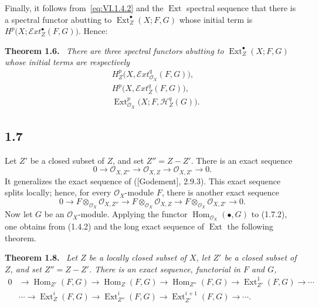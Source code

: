 \documentclass[11pt,a4paper]{article}
\newcommand{\OX}{\mathcal O_X}
\newcommand{\OXZ}[1]{\mathcal O_{X,#1}}
\newcommand{\Ext}{\operatorname{Ext}}
\newcommand{\Homop}{\operatorname{Hom}}
\newcommand{\SheafExt}{\mathcal E\!xt}
\newcommand{\SheafH}{\mathcal H}
\newenvironment{sgastatement}[1]{\par\addvspace{0.8\baselineskip}\noindent\textbf{#1.}\ \itshape}{\par}
\begin{document}
Finally, it follows from~\eqref{eq:VI.1.4.2} and the $\Ext$ spectral sequence
that there is a spectral functor abutting to $\Ext_Z^{\bullet}(X;F,G)$ whose
initial term is $H^p\bigl(X;\SheafExt_Z^{\bullet}(F,G)\bigr)$. Hence:

\begin{sgastatement}{Theorem 1.6}
There are three spectral functors abutting to
$\Ext_Z^{\bullet}(X;F,G)$ whose initial terms are respectively
\begin{align}
 &H_Z^p\bigl(X,\SheafExt_{\OX}^q(F,G)\bigr),
   \tag{1.6.1}\label{eq:VI.1.6.1}\\[-0.15em]
 &H^p\bigl(X,\SheafExt_Z^q(F,G)\bigr),
   \tag{1.6.2}\label{eq:VI.1.6.2}\\[-0.15em]
 &\Ext_{\OX}^p\bigl(X;F,\SheafH_Z^q(G)\bigr).
   \tag{1.6.3}\label{eq:VI.1.6.3}
\end{align}
\end{sgastatement}

\subsection*{1.7}
Let $Z'$ be a closed subset of $Z$, and set $Z''=Z-Z'$. There is an exact
sequence
\begin{equation}
 0\longrightarrow \OXZ{Z''}\longrightarrow \OXZ{Z}
 \longrightarrow \OXZ{Z'}\longrightarrow 0.
 \tag{1.7.1}
\end{equation}
It generalizes the exact sequence of \textup{([Godement], 2.9.3)}. This exact
sequence splits locally; hence, for every $\OX$-module $F$, there is another
exact sequence
\begin{equation}
 0\longrightarrow F\otimes_{\OX}\OXZ{Z''}
 \longrightarrow F\otimes_{\OX}\OXZ{Z}
 \longrightarrow F\otimes_{\OX}\OXZ{Z'}\longrightarrow 0.
 \tag{1.7.2}
\end{equation}
Now let $G$ be an $\OX$-module. Applying the functor
$\Homop_{\OX}(\mathbin{\bullet},G)$ to (1.7.2), one obtains from (1.4.2) and
the long exact sequence of $\Ext$ the following theorem.

\begin{sgastatement}{Theorem 1.8}
Let $Z$ be a locally closed subset of $X$, let $Z'$ be a closed subset of
$Z$, and set $Z''=Z-Z'$. There is an exact sequence, functorial in $F$ and
$G$,
\[
\begin{aligned}
 0&\longrightarrow \Homop_{Z'}(F,G)\longrightarrow \Homop_Z(F,G)
 \longrightarrow \Homop_{Z''}(F,G)\longrightarrow \Ext_{Z'}^1(F,G)
 \longrightarrow\cdots \\
 &\cdots\longrightarrow \Ext_Z^i(F,G)\longrightarrow \Ext_{Z''}^i(F,G)
 \longrightarrow \Ext_{Z'}^{i+1}(F,G)\longrightarrow\cdots .
\end{aligned}
\]
\end{sgastatement}
\end{document}
